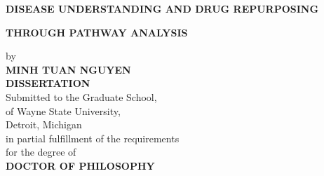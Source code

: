 \centerline{\uppercase{\bf Disease understanding and drug repurposing}}
\vspace{-0.4cm}
\centerline{\uppercase{\bf through pathway analysis}}

\vskip-0.4cm
\thispagestyle{empty}

\begin{center}
    \vspace{-0.4cm}
    by \\
    {\bf \uppercase{Minh Tuan Nguyen}}\\ %
    {\bf \uppercase{Dissertation}}\\  %
    Submitted to the Graduate School,\\
    of Wayne State University,\\
    Detroit, Michigan\\
    in partial fulfillment of the requirements\\
    for the degree of\\
    {\bf DOCTOR OF PHILOSOPHY} %
\end{center}

